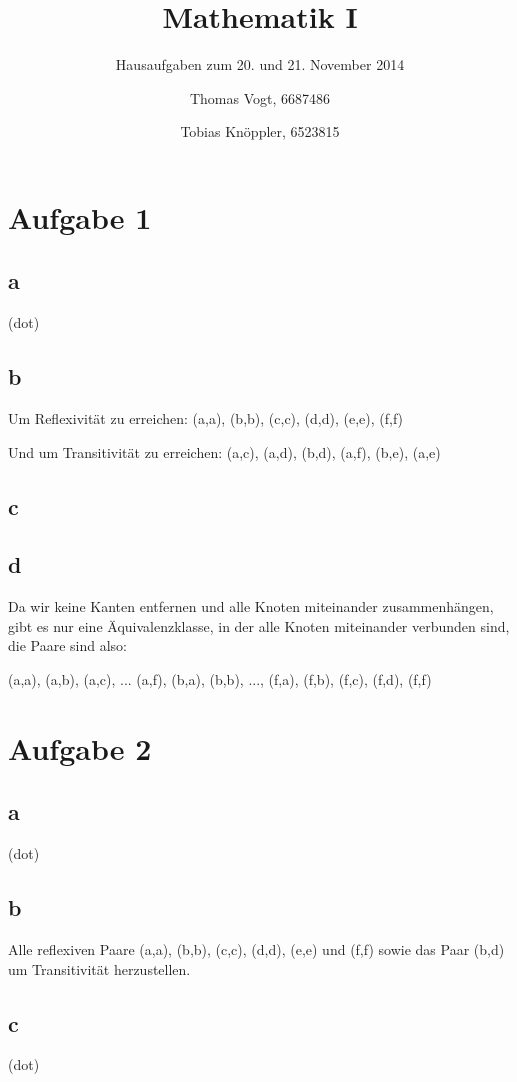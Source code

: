\documentclass[11pt, oneside]{scrartcl}   	%
\title{Mathematik I}
\subtitle{Hausaufgaben zum 20. und 21. November 2014}
\author{Thomas Vogt, 6687486 \and Tobias Knöppler, 6523815}
\date{}
\begin{document}
\maketitle
\section*{Aufgabe 1}

\subsection*{a}
(dot)

\subsection*{b}
Um Reflexivität zu erreichen:
(a,a), (b,b), (c,c), (d,d), (e,e), (f,f)

Und um Transitivität zu erreichen:
(a,c), (a,d), (b,d), (a,f), (b,e), (a,e)

\subsection*{c}

\subsection*{d}
Da wir keine Kanten entfernen und alle Knoten miteinander zusammenhängen, gibt es nur eine Äquivalenzklasse, in der alle Knoten miteinander verbunden sind, die Paare sind also:

(a,a), (a,b), (a,c), ... (a,f), (b,a), (b,b), ..., (f,a), (f,b), (f,c), (f,d), (f,f)


\section*{Aufgabe 2}

\subsection*{a}
(dot)

\subsection*{b}
Alle reflexiven Paare (a,a), (b,b), (c,c), (d,d), (e,e) und (f,f) sowie das Paar (b,d) um Transitivität herzustellen.

\subsection*{c}
(dot)
\end{document}
